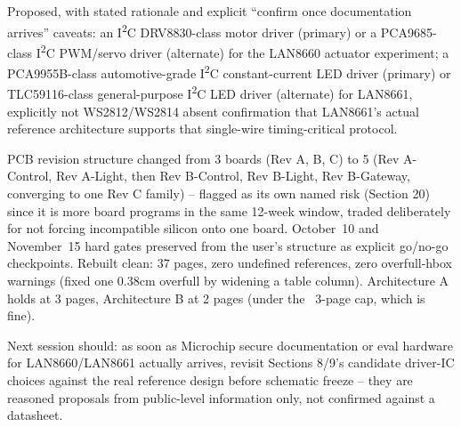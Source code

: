{Proposed, with stated rationale and explicit ``confirm once documentation
arrives'' caveats: an I\textsuperscript{2}C DRV8830-class motor driver
(primary) or a PCA9685-class I\textsuperscript{2}C PWM/servo driver
(alternate) for the LAN8660 actuator experiment; a PCA9955B-class
automotive-grade I\textsuperscript{2}C constant-current LED driver
(primary) or TLC59116-class general-purpose I\textsuperscript{2}C LED
driver (alternate) for LAN8661, explicitly not WS2812/WS2814 absent
confirmation that LAN8661's actual reference architecture supports that
single-wire timing-critical protocol.

PCB revision structure changed from 3 boards (Rev A, B, C) to 5 (Rev
A-Control, Rev A-Light, then Rev B-Control, Rev B-Light, Rev B-Gateway,
converging to one Rev C family) -- flagged as its own named risk (Section
20) since it is more board programs in the same 12-week window, traded
deliberately for not forcing incompatible silicon onto one board. October~10
and November~15 hard gates preserved from the user's structure as explicit
go/no-go checkpoints. Rebuilt clean: 37 pages, zero undefined references,
zero overfull-hbox warnings (fixed one 0.38cm overfull by widening a table
column). Architecture A holds at 3 pages, Architecture B at 2 pages (under
the ~3-page cap, which is fine).

Next session should: as soon as Microchip secure documentation or eval
hardware for LAN8660/LAN8661 actually arrives, revisit Sections 8/9's
candidate driver-IC choices against the real reference design before
schematic freeze -- they are reasoned proposals from public-level
information only, not confirmed against a datasheet.
}

